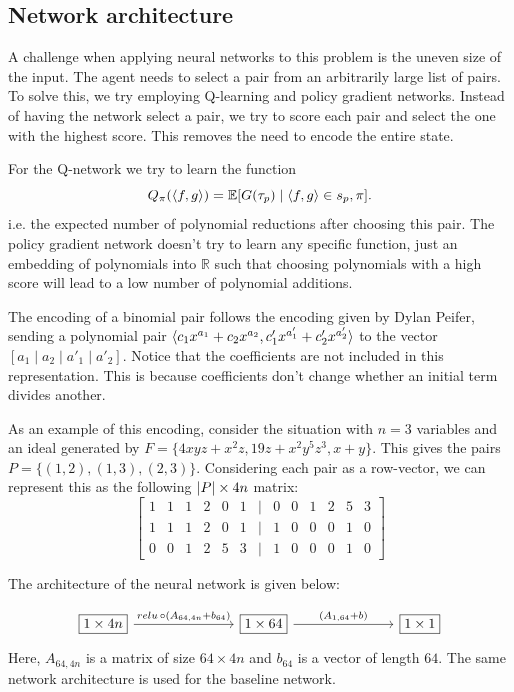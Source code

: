\documentclass{article}
\theoremstyle{changedot}
\theoremstyle{changedotbreak}
\theoremstyle{nonumberplain}
\DeclarePairedDelimiter{\tuple}{\langle}{\rangle}
\newcommand{\m}{\mathbb}
\DeclarePairedDelimiter{\abs}{\lvert}{\rvert}
\newcommand{\card}[1]{\abs{#1}}
\begin{document}
\subsection{Network architecture}\label{sec:arch}
A challenge when applying neural networks to this problem is the uneven size of the input. The agent needs to select a pair from an arbitrarily large list of pairs. To solve this, we try employing Q-learning and policy gradient networks. Instead of having the network select a pair, we try to score each pair and select the one with the highest score. This removes the need to encode the entire state.

For the Q-network we try to learn the function \[Q_{\pi}(\tuple{f, g}) = \m E[G(\tau_{p}) \mid \tuple{f, g} \in s_{p}, \pi].\] i.e. the expected number of polynomial reductions after choosing this pair. The policy gradient network doesn't try to learn any specific function, just an embedding of polynomials into $\m R$ such that choosing polynomials with a high score will lead to a low number of polynomial additions.

The encoding of a binomial pair follows the encoding given by Dylan Peifer, sending a polynomial pair $\tuple{c_{1}x^{a_{1}} + c_{2}x^{a_{2}}, c'_{1}x^{a'_{1}} + c'_{2} x^{a'_{2}}}$ to the vector $[a_{1} \mid a_{2} \mid a'_{1} \mid a'_{2}]$. Notice that the coefficients are not included in this representation. This is because coefficients don't change whether an initial term divides another.

As an example of this encoding, consider the situation with $n=3$ variables and an ideal generated by $F = \{4xyz + x^{2}z, 19z + x^{2}y^{5}z^{3}, x + y\}$. This gives the pairs $P = \{(1, 2), (1, 3), (2, 3)\}$. Considering each pair as a row-vector, we can represent this as the following $\card P \times 4n$ matrix:
\[\begin{bmatrix}
    1 & 1 & 1 & 2 & 0 & 1 &\mid & 0 & 0 & 1 & 2 & 5 & 3 \\
    1 & 1 & 1 & 2 & 0 & 1 &\mid & 1 & 0 & 0 & 0 & 1 & 0 \\
    0 & 0 & 1 & 2 & 5 & 3 &\mid & 1 & 0 & 0 & 0 & 1 & 0
  \end{bmatrix}\]

The architecture of the neural network is given below:

\[\begin{tikzcd}
	{\boxed{1 \times 4n}} &&& {\boxed{1 \times 64}} &&& {\boxed{1\times1}}
	\arrow["{relu \,\circ (A_{64, 4n} + b_{64})}", from=1-1, to=1-4]
	\arrow["{(A_{1, 64} + b)}", from=1-4, to=1-7]
\end{tikzcd}\]
Here, $A_{64, 4n}$ is a matrix of size $64 \times 4n$ and $b_{64}$ is a vector of length $64$. The same network architecture is used for the baseline network.
\end{document}
